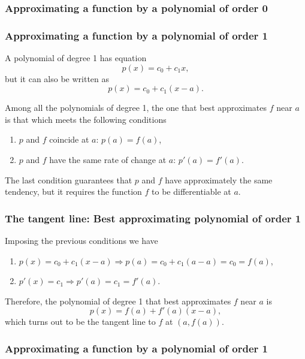 \begin{frame}
	\frametitle{Approximating a function by a polynomial of order 0}
	\begin{center}
		
	\end{center}
\end{frame}


\begin{frame}
	\frametitle{Approximating a function by a polynomial of order 1}
	A polynomial of degree 1 has equation
	\[
		p(x) = c_0+c_1x,
	\]
	but it can also be written as 
	\[
		p(x) = c_0+c_1(x-a).
	\]
	
	Among all the polynomials of degree 1, the one that best approximates $f$ near $a$ is that which meets the following conditions
	
	\begin{enumerate}
		\item $p$ and $f$ coincide at $a$: $p(a) = f(a)$,
		\item $p$ and $f$ have the same rate of change at $a$: $p'(a) = f'(a)$.
	\end{enumerate}
	
	The last condition guarantees that $p$ and $f$ have approximately the same tendency, but it requires the function $f$ to be differentiable at $a$.
\end{frame}


\begin{frame}
	\frametitle{The tangent line: Best approximating polynomial of order 1}
	Imposing the previous conditions we have
	\begin{enumerate}
		\item $p(x)=c_0+c_1(x-a) \Rightarrow p(a)=c_0+c_1(a-a)=c_0=f(a)$,
		\item $p'(x)=c_1 \Rightarrow p'(a)=c_1=f'(a)$.
	\end{enumerate}
	
	Therefore, the polynomial of degree 1 that best approximates $f$ near $a$ is
	\[
		p(x) = f(a)+f '(a)(x-a),
	\]
	which turns out to be the tangent line to $f$ at $(a,f(a))$.
\end{frame}


\begin{frame}
	\frametitle{Approximating a function by a polynomial of order 1}
	\begin{center}
		
	\end{center}
\end{frame}


